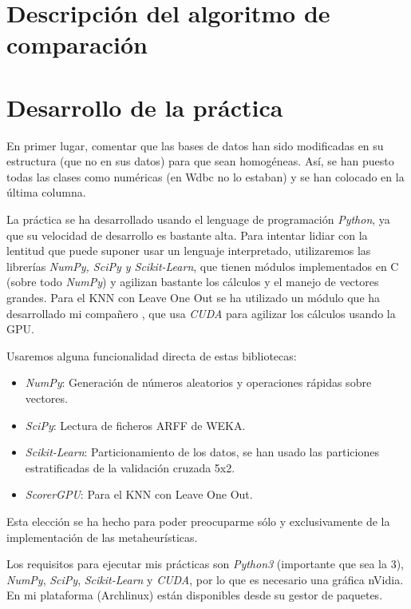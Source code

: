 \documentclass[a4paper, 11pt]{article}
\begin{document}
  \section{Descripción del algoritmo de comparación}
    
  \section{Desarrollo de la práctica}
    En primer lugar, comentar que las bases de datos han sido modificadas en su estructura (que no en sus datos) para que sean homogéneas. Así, se han puesto todas las clases como numéricas (en Wdbc no lo estaban) y se han colocado en la última columna.

    La práctica se ha desarrollado usando el lenguage de programación \emph{Python}, ya que su velocidad de desarrollo es bastante alta. Para intentar lidiar con la lentitud que puede suponer usar un lenguaje interpretado, utilizaremos las librerías \emph{NumPy, SciPy y Scikit-Learn}, que tienen módulos implementados en C (sobre todo \emph{NumPy}) y agilizan bastante los cálculos y el manejo de vectores grandes. Para el KNN con Leave One Out se ha utilizado un módulo que ha desarrollado mi compañero , que usa \emph{CUDA} para agilizar los cálculos usando la GPU.

    Usaremos alguna funcionalidad directa de estas bibliotecas:
    \begin{itemize}
      \item \emph{NumPy}: Generación de números aleatorios y operaciones rápidas sobre vectores.
      \item \emph{SciPy}: Lectura de ficheros ARFF de WEKA.
      \item \emph{Scikit-Learn}: Particionamiento de los datos, se han usado las particiones estratificadas de la validación cruzada 5x2.
      \item \emph{ScorerGPU}: Para el KNN con Leave One Out.
    \end{itemize}

    Esta elección se ha hecho para poder preocuparme sólo y exclusivamente de la implementación de las metaheurísticas.

    Los requisitos para ejecutar mis prácticas son \emph{Python3} (importante que sea la 3), \emph{NumPy}, \emph{SciPy}, \emph{Scikit-Learn} y \emph{CUDA}, por lo que es necesario una gráfica nVidia. En mi plataforma (Archlinux) están disponibles desde su gestor de paquetes.
\end{document}
